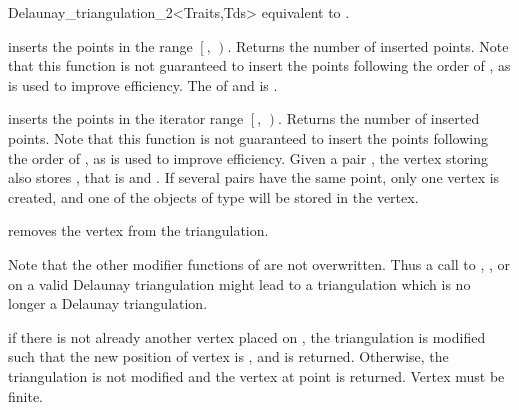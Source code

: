 \begin{ccRefClass}{Delaunay_triangulation_2<Traits,Tds>}
{equivalent to .}

{inserts the points in the range
 $\left[\right.$, $\left.\right)$.
 Returns the number of inserted points.
 Note that this function is not guaranteed to insert the points
 following the order of , as 
 is used to improve efficiency.
 \ccPrecond The  of  and 
 is .}

{
inserts the points in the iterator range $\left[\right.$,
$\left.\right)$.  Returns the number of inserted points.
Note that this function is not guaranteed to insert the points
following the order of , as 
is used to improve efficiency.
Given a pair ,  the vertex  storing  also stores , that is 
 and . If several pairs have the same point, 
only one vertex is created, and one of the objects of type  will be stored in the vertex.
}

{removes the vertex from the triangulation.}

Note that the other modifier functions  of
 are not overwritten.
Thus a  call to 
, ,
  or 
on a valid Delaunay triangulation might lead to a triangulation
which is no longer a Delaunay triangulation.


{if there is not already another vertex placed on , 
the triangulation is modified such that the new position of vertex 
is , and  is returned. Otherwise, the triangulation is not
modified and the vertex at point  is returned.
\ccPrecond Vertex  must be finite.}


\end{ccRefClass}
